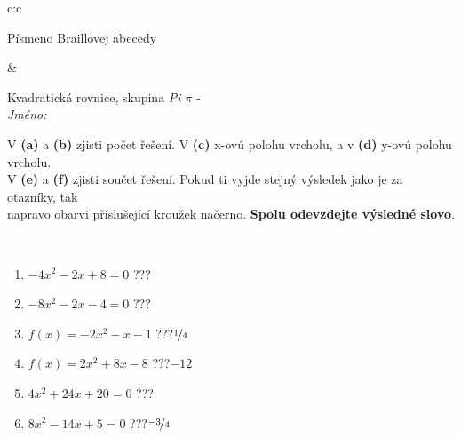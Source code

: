 \documentclass[10pt]{report}
\begin{document}
\begin{tabular}{c:c}
\begin{minipage}[c][104.5mm][t]{0.5\linewidth}
\begin{center}
\begin{minipage}{0.20\linewidth}
\begin{center}
{\small Písmeno Braillovej abecedy}
\end{center}
\end{minipage}
\end{center}
\end{minipage}
&
\begin{minipage}[c][104.5mm][t]{0.5\linewidth}
\begin{center}
\vspace{7mm}
{\huge Kvadratická rovnice, skupina \textit{Pi $\pi$} -}\\[5mm]
\textit{Jméno:}\phantom{xxxxxxxxxxxxxxxxxxxxxxxxxxxxxxxxxxxxxxxxxxxxxxxxxxxxxxxxxxxxxxxxx}\\[5mm]
\begin{minipage}{0.95\linewidth}
\begin{center}
V \textbf{(a)} a \textbf{(b)} zjisti počet řešení. V \textbf{(c)} x-ovú polohu vrcholu, a v \textbf{(d)} y-ovú polohu vrcholu.\\V \textbf{(e)} a \textbf{(f)} zjisti součet řešení. Pokud ti vyjde stejný výsledek jako je za otazníky, tak\\napravo obarvi příslušející kroužek načerno. \textbf{Spolu odevzdejte výsledné slovo}.
\end{center}
\end{minipage}
\\[1mm]
\begin{minipage}{0.79\linewidth}
\begin{center}
\begin{varwidth}{\linewidth}
\begin{enumerate}
\Large
\item $-4x^2-2x+8=0$\quad \dotfill\; ???\;\dotfill {}
\item $-8x^2-2x-4=0$\quad \dotfill\; ???\;\dotfill {}
\item $f(x)=-2x^2-x-1$\quad \dotfill\; ???\;\dotfill \quad $\nicefrac{1}{4}$
\item $f(x)=2x^2+8x-8$\quad \dotfill\; ???\;\dotfill \quad $-12$
\item $4x^2+24x+20=0$\quad \dotfill\; ???\;\dotfill {}
\item $8x^2-14x+5=0$\quad \dotfill\; ???\;\dotfill \quad $\nicefrac{-3}{4}$
\end{enumerate}
\end{varwidth}
\end{center}
\end{minipage}
\begin{minipage}{0.20\linewidth}
\begin{center}

\end{center}
\end{minipage}
\end{center}
\end{minipage}
\end{tabular}
\end{document}
